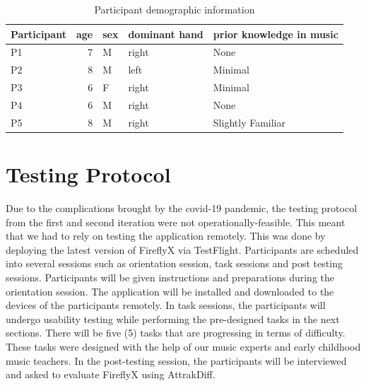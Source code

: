

\begin{table}[]
\begin{tabular}{|l|r|l|l|l|}
\hline
Participant & \multicolumn{1}{l|}{age} & sex    & dominant hand & prior knowledge in music \\ \hline
P1      & 7                        & M   & right    & None                     \\ \hline
P2      & 8                        & M   & left     & Minimal                  \\ \hline
P3      & 6                        & F & right    & Minimal                  \\ \hline
P4      & 6                        & M   & right     & None                     \\ \hline
P5      & 8                        & M   & right    & Slightly Familiar        \\ \hline
\end{tabular}
\caption{Participant demographic information}
\label{tab:ParticipantDemographic}
\end{table}

\section{Testing Protocol}
Due to the complications brought by the covid-19 pandemic, the testing protocol from the first and second iteration were not operationally-feasible. This meant that we had to rely on testing the application remotely. This was done by deploying the latest version of FireflyX via TestFlight. Participants are scheduled into several sessions such as orientation session, task sessions and post testing sessions. Participants will be given instructions and preparations during the orientation session. The application will be installed and downloaded to the devices of the participants remotely. In task sessions, the participants will undergo usability testing while performing the pre-designed tasks in the next sections. There will be five (5) tasks that are progressing in terms of difficulty. These tasks were designed with the help of our music experts and early childhood music teachers. In the post-testing session, the participants will be interviewed and asked to evaluate FireflyX using AttrakDiff. 

